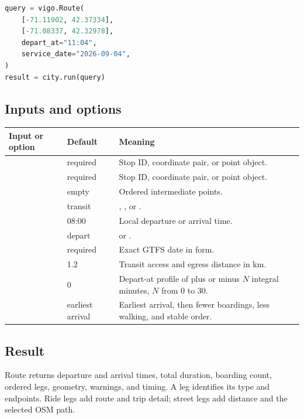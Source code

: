 \documentclass[10pt,letterpaper]{article}
\begin{document}
\begin{lstlisting}[language=Python]
query = vigo.Route(
    [-71.11902, 42.37334],
    [-71.08337, 42.32978],
    depart_at="11:04",
    service_date="2026-09-04",
)
result = city.run(query)
\end{lstlisting}

\subsection{Inputs and options}

\begin{longtable}{P{1.72in} P{1.04in} P{3.54in}}
\toprule
\textbf{Input or option} & \textbf{Default} & \textbf{Meaning} \\
\midrule
\endhead
{} & required & Stop ID, coordinate pair, or point object. \\
 & required & Stop ID, coordinate pair, or point object. \\
 & empty & Ordered intermediate points. \\
 & transit & , , or . \\
 & 08:00 & Local departure or arrival time. \\
 & depart &  or . \\
 & required & Exact GTFS date in  form. \\
 & 1.2 & Transit access and egress distance in km. \\
 & 0 & Depart-at profile of plus or minus $N$ integral minutes, $N$ from 0 to 30. \\
 & earliest arrival & Earliest arrival, then fewer boardings, less walking, and stable order. \\
\bottomrule
\end{longtable}

\subsection{Result}

Route returns departure and arrival times, total duration, boarding count, ordered legs, geometry, warnings, and timing. A leg identifies its type and endpoints. Ride legs add route and trip detail; street legs add distance and the selected OSM path.
\end{document}

